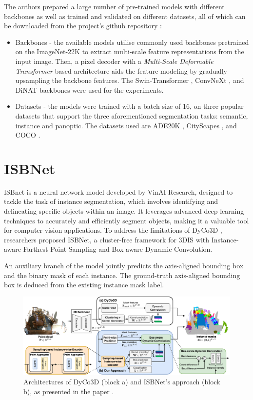 The authors prepared a large number of pre-trained models with different backbones as well as trained and validated on different datasets, all of which can be downloaded from the project's github repository \cite{oneformer-repo}:
 
\begin{itemize}
    \item Backbones - the available models utilise commonly used backbones pretrained on the ImageNet-22K \cite{deng2009imagenet} to extract multi-scale feature representations from the input image. Then, a pixel decoder with a \textit{Multi-Scale Deformable Transformer} \cite{zhu2020deformable, cheng2021mask2former} based architecture aids the feature modeling by gradually upsampling the backbone features. The Swin-Transformer \cite{liu2021Swin}, ConvNeXt \cite{liu2022convnet}, and DiNAT \cite{hassani2022dilated} backbones were used for the experiments.
    \item Datasets - the models were trained with a batch size of 16, on three popular datasets that support the three aforementioned segmentation tasks: semantic, instance and panoptic. The datasets used are ADE20K \cite{zhou2019semantic, zhou2017scene}, CityScapes \cite{Cordts2016Cityscapes}, and COCO \cite{lin2015microsoft}.
\end{itemize}


\section{ISBNet}
ISBnet \cite{ngo2023isbnet} is a neural network model developed by VinAI Research, designed to tackle the task of instance segmentation, which involves identifying and delineating specific objects within an image. It leverages advanced deep learning techniques to accurately and efficiently segment objects, making it a valuable tool for computer vision applications.
To address the limitations of DyCo3D \cite{He2021dyco3d}, researchers proposed ISBNet, a cluster-free framework for 3DIS with Instance-aware Farthest Point Sampling and Box-aware Dynamic Convolution.

An auxiliary branch of the model jointly predicts the axis-aligned bounding box and the binary mask of each instance. The ground-truth axis-aligned bounding box is deduced from the existing instance mask label.

\begin{figure}[ht]
    \centering
    \includegraphics[width=1.0\textwidth]{img/isbnet_arch.png}
    \caption{Architectures of DyCo3D (block a) and ISBNet's approach (block b), as presented in the paper \cite{ngo2023isbnet}.}
    \label{fig:isbnet-architecture}
\end{figure}
	
